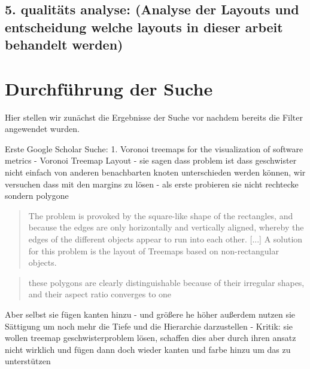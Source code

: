 \subsection*{5. qualitäts analyse: (Analyse der Layouts und entscheidung welche layouts in dieser arbeit behandelt werden)} \label{sec:QualitaetsAnalyse}

\section{Durchführung der Suche}
Hier stellen wir zunächst die Ergebnisse der Suche vor nachdem bereits die Filter angewendet wurden.

Erste Google Scholar Suche:
1. Voronoi treemaps for the visualization of software metrics \cite{voronoiTree}
- Voronoi Treemap Layout
- sie sagen dass problem ist dass geschwister nicht einfach von anderen benachbarten knoten unterschieden werden können, wir versuchen dass mit den margins zu lösen
- als erste probieren sie nicht rechtecke sondern polygone
\begin{quote}
    The problem is provoked by the square-like shape of the rectangles, and because the edges are only horizontally and vertically aligned, whereby the edges of the different objects appear to run into each other. [...] A solution for this problem is the layout of Treemaps based on non-rectangular objects.\cite[3]{voronoiTree}
\end{quote}
\begin{quote}
    these polygons are clearly distinguishable because of their irregular shapes, and their aspect ratio converges to one \cite[6]{voronoiTree}
\end{quote}
Aber selbst sie fügen kanten hinzu - und größere he höher
außerdem nutzen sie Sättigung um noch mehr die Tiefe und die Hierarchie darzustellen
- Kritik: sie wollen treemap geschwisterproblem lösen, schaffen dies aber durch ihren ansatz nicht wirklich und fügen dann doch wieder kanten und farbe hinzu um das zu unterstützen

